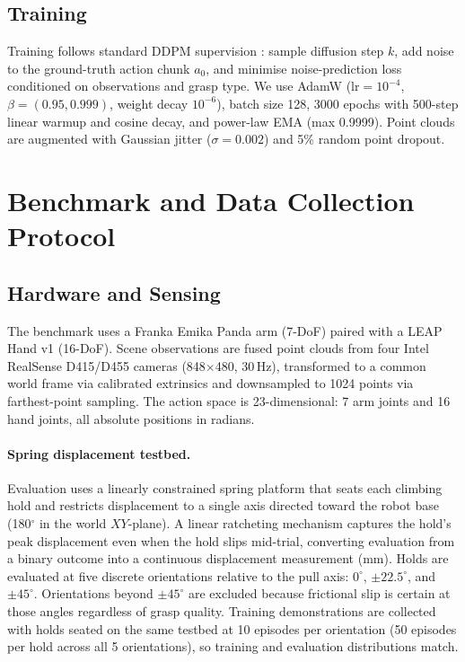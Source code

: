 \documentclass[11pt]{article}
\begin{document}
\subsection{Training}
Training follows standard DDPM supervision \citep{ho2020ddpm}: sample diffusion step
$k$, add noise to the ground-truth action chunk $a_0$, and minimise noise-prediction
loss conditioned on observations and grasp type. We use AdamW \citep{loshchilov2019adamw}
($\text{lr} = 10^{-4}$, $\beta = (0.95, 0.999)$, weight decay $10^{-6}$), batch size
128, 3000 epochs with 500-step linear warmup and cosine decay, and power-law EMA
(max 0.9999). Point clouds are augmented with Gaussian jitter ($\sigma = 0.002$) and
5\% random point dropout.

\section{Benchmark and Data Collection Protocol}
\subsection{Hardware and Sensing}
The benchmark uses a Franka Emika Panda arm (7-DoF) paired with a LEAP Hand v1
(16-DoF). Scene observations are fused point clouds from four Intel RealSense D415/D455
cameras (848$\times$480, 30\,Hz), transformed to a common world frame via calibrated
extrinsics and downsampled to 1024 points via farthest-point sampling. The action space
is 23-dimensional: 7 arm joints and 16 hand joints, all absolute positions in radians.

\paragraph{Spring displacement testbed.}
Evaluation uses a linearly constrained spring platform that seats each climbing hold and
restricts displacement to a single axis directed toward the robot base (180$^\circ$ in
the world $XY$-plane). A linear ratcheting mechanism captures the hold's peak
displacement even when the hold slips mid-trial, converting evaluation from a binary
outcome into a continuous displacement measurement (mm). Holds are evaluated at five
discrete orientations relative to the pull axis: $0^\circ$, $\pm 22.5^\circ$, and
$\pm 45^\circ$. Orientations beyond $\pm 45^\circ$ are excluded because frictional
slip is certain at those angles regardless of grasp quality. Training demonstrations are
collected with holds seated on the same testbed at 10 episodes per orientation (50
episodes per hold across all 5 orientations), so training and evaluation distributions
match.
\end{document}
